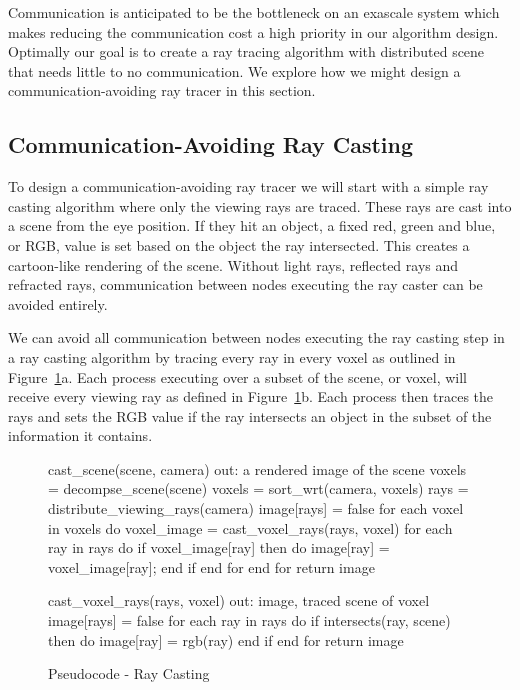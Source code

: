 Communication is anticipated to be the bottleneck on an exascale system which
makes reducing the communication cost a high priority in our algorithm design.  
Optimally our goal is to create a ray tracing algorithm with distributed scene 
that needs little to no communication.  We explore how we might design a 
communication-avoiding ray tracer in this section.

\subsection{Communication-Avoiding Ray Casting}
\label{sec:ca-ray-casting}
To design a communication-avoiding ray tracer we will start with a simple ray
casting algorithm where only the viewing rays are traced. These rays are 
cast into a scene from the eye position.  If they hit an object, a fixed red,
green and blue, or RGB, value is set based on the object the ray intersected.
This creates a cartoon-like rendering of the scene.  Without light rays,
reflected rays and refracted rays, communication between nodes executing the
ray caster can be avoided entirely.

We can avoid all communication between nodes executing the ray casting step in a
ray casting algorithm by tracing every ray in every voxel as outlined in
Figure~\ref{fig:ray_caster}a. Each process executing over a subset of the scene,
or voxel, will receive every viewing ray as defined in
Figure~\ref{fig:ray_caster}b.  Each process then traces the rays and sets the
RGB value if the ray intersects an object in the subset of the information it
contains.

\begin{figure}[!htb]
\begin{algorithm}
cast_scene(scene, camera) 
  out: a rendered image of the scene
  voxels = decompse_scene(scene)
  voxels = sort_wrt(camera, voxels)
  rays = distribute_viewing_rays(camera)
  image[rays] = false
  for each voxel in voxels do
    voxel_image = cast_voxel_rays(rays, voxel)
    for each ray in rays do
      if voxel_image[ray] then do
        image[ray] = voxel_image[ray];
      end if
    end for
  end for
return image
\end{algorithm}


\endminipage\hfill
{}
\begin{algorithm}
cast_voxel_rays(rays, voxel)
  out: image, traced scene of voxel
  image[rays] = false
  for each ray in rays do
    if intersects(ray, scene) then do
      image[ray] = rgb(ray)
    end if
  end for
return image






\end{algorithm}


\endminipage\hfill
\caption{Pseudocode - Ray Casting}
\label{fig:ray_caster}
\end{figure}

